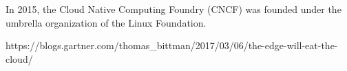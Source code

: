 In 2015, the Cloud Native Computing Foundry (CNCF) was founded under the 
umbrella organization of the Linux Foundation. 

https://blogs.gartner.com/thomas_bittman/2017/03/06/the-edge-will-eat-the-cloud/